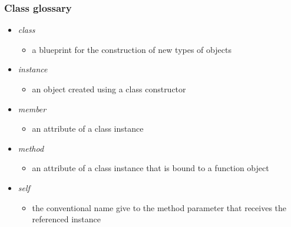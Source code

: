 \begin{frame}[fragile]
%
  \frametitle{Class glossary}
%
  \begin{itemize}
%
  \item \emph{class}
    \begin{itemize}
    \item a blueprint for the construction of new types of objects
    \end{itemize}
%
  \item \emph{instance}
    \begin{itemize}
    \item an object created using a class constructor
    \end{itemize}
%
  \item \emph{member}
    \begin{itemize}
    \item an attribute of a class instance
    \end{itemize}
%
  \item \emph{method}
    \begin{itemize}
    \item an attribute of a class instance that is bound to a function object
    \end{itemize}
%
  \item \emph{self}
    \begin{itemize}
    \item the conventional name give to the method parameter that receives the referenced
      instance
    \end{itemize}
%
  \end{itemize}
%
\end{frame}

